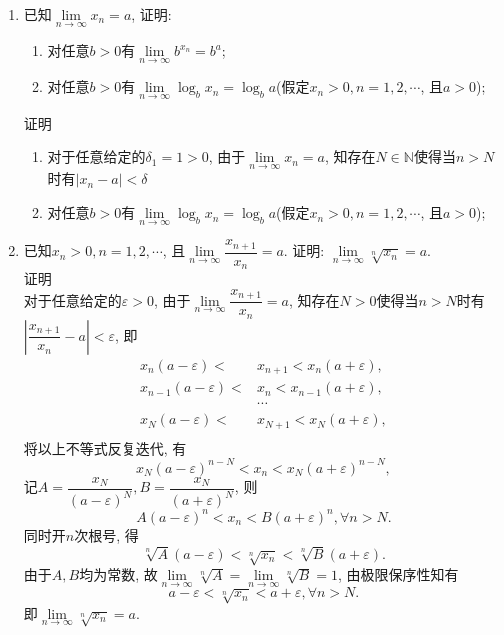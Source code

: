 \documentclass[UTF8,a4paper,20pt]{article}
\begin{document}
\begin{enumerate}
\item 已知$\lim\limits_{n\to\infty}x_n=a$, 证明:
	\begin{enumerate}[(1)]
	\item 对任意$b>0$有$\lim\limits_{n\to\infty}b^{x_n}=b^a$;
	\item 对任意$b>0$有$\lim\limits_{n\to\infty}\log_bx_n=\log_ba$(假定$x_n>0,n=1,2,\cdots$, 且$a>0$);
	\end{enumerate}
{\heiti 证明}
	\begin{enumerate}[(1)]
	\item 对于任意给定的$\delta_1=1>0$, 由于$\lim\limits_{n\to\infty}x_n=a$, 知存在$N\in\mathbb{N}$使得当$n>N$时有$|x_n-a|<\delta$
	\item 对任意$b>0$有$\lim\limits_{n\to\infty}\log_bx_n=\log_ba$(假定$x_n>0,n=1,2,\cdots$, 且$a>0$);
	\end{enumerate}
\item 已知$x_n>0, n=1,2,\cdots$, 且$\lim\limits_{n\to\infty}\dfrac{x_{n+1}}{x_n}=a$. 证明: $\lim\limits_{n\to\infty}\sqrt[n]{x_n}=a$.\\
{\heiti 证明}\\
	对于任意给定的$\varepsilon>0$, 由于$\lim\limits_{n\to\infty}\dfrac{x_{n+1}}{x_n}=a$, 知存在$N>0$使得当$n>N$时有$|\dfrac{x_{n+1}}{x_n}-a|<\varepsilon$, 即
\begin{equation*}
	\begin{split}
	x_n(a-\varepsilon)<&x_{n+1}<x_n(a+\varepsilon),\\
	x_{n-1}(a-\varepsilon)<&x_n<x_{n-1}(a+\varepsilon),\\
	&\cdots\\
	x_N(a-\varepsilon)<&x_{N+1}<x_N(a+\varepsilon),\\
	\end{split}
\end{equation*}
将以上不等式反复迭代, 有
\[x_N(a-\varepsilon)^{n-N}<x_n<x_N(a+\varepsilon)^{n-N},\]  
记$A=\dfrac{x_N}{(a-\varepsilon)^N}, B=\dfrac{x_N}{(a+\varepsilon)^N}$, 则
\[A(a-\varepsilon)^n<x_n<B(a+\varepsilon)^n, \forall n>N.\]
同时开$n$次根号, 得
\[\sqrt[n]{A}(a-\varepsilon)<\sqrt[n]{x_n}<\sqrt[n]{B}(a+\varepsilon).\]
由于$A,B$均为常数, 故$\lim\limits_{n\to\infty}\sqrt[n]{A}=\lim\limits_{n\to\infty}\sqrt[n]{B}=1$, 由极限保序性知有
\[a-\varepsilon<\sqrt[n]{x_n}<a+\varepsilon, \forall n>N.\]
即$\lim\limits_{n\to\infty}\sqrt[n]{x_n}=a$.


\end{enumerate}
\end{document}

